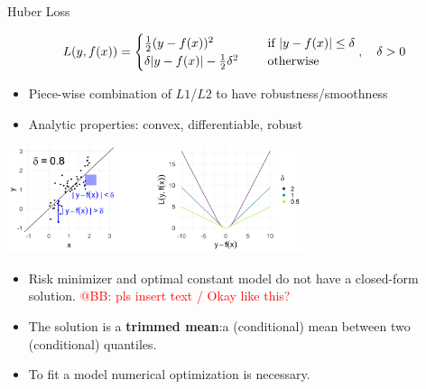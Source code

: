 \begin{vbframe}{Huber Loss}

\vspace*{-0.5cm}

$$
L(y, f(x)) = \begin{cases}
  \frac{1}{2}(y - f(x))^2  & \text{ if } |y - f(x)| \le \delta \\
  \delta |y - f(x)|-\frac{1}{2}\delta^2 \quad & \text{ otherwise }
  \end{cases}, \quad \delta > 0
$$

\begin{itemize}
\item Piece-wise combination of $L1$/$L2$ to have robustness/smoothness
\item Analytic properties: convex, differentiable, robust
\end{itemize}



\begin{center}
\includegraphics[width = 0.65\textwidth]{figure/loss_huber_plot.png}
\end{center}

\vspace*{-0.2cm}

\begin{itemize}
\item Risk minimizer and optimal constant model do not have a closed-form solution. \textcolor{red}{@BB: pls insert text / Okay like this? }
\item The solution is a \textbf{trimmed mean}:a (conditional) mean between two (conditional) quantiles. %
\item To fit a model numerical optimization is necessary. 


\end{itemize}
\end{vbframe}

